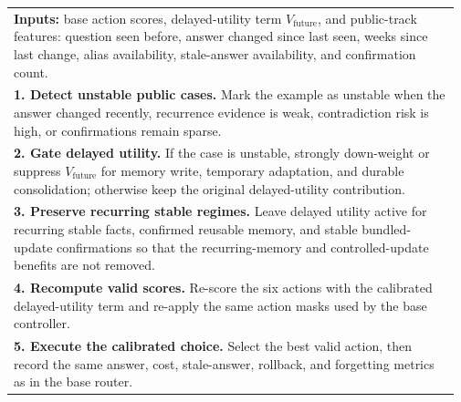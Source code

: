 \begin{tabular}{p{0.97\linewidth}}
\toprule
\textbf{Inputs:} base action scores, delayed-utility term $V_{\text{future}}$, and public-track features: question seen before, answer changed since last seen, weeks since last change, alias availability, stale-answer availability, and confirmation count. \\
\textbf{1. Detect unstable public cases.} Mark the example as unstable when the answer changed recently, recurrence evidence is weak, contradiction risk is high, or confirmations remain sparse. \\
\textbf{2. Gate delayed utility.} If the case is unstable, strongly down-weight or suppress $V_{\text{future}}$ for memory write, temporary adaptation, and durable consolidation; otherwise keep the original delayed-utility contribution. \\
\textbf{3. Preserve recurring stable regimes.} Leave delayed utility active for recurring stable facts, confirmed reusable memory, and stable bundled-update confirmations so that the recurring-memory and controlled-update benefits are not removed. \\
\textbf{4. Recompute valid scores.} Re-score the six actions with the calibrated delayed-utility term and re-apply the same action masks used by the base controller. \\
\textbf{5. Execute the calibrated choice.} Select the best valid action, then record the same answer, cost, stale-answer, rollback, and forgetting metrics as in the base router. \\
\bottomrule
\end{tabular}
